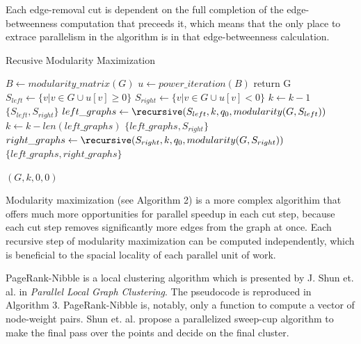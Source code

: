 Each edge-removal cut is dependent on the full completion of the
edge-betweenness computation that preceeds it, which means that the only
place to extrace parallelism in the algorithm is in that
edge-betweenness calculation.  

{\centering
\begin{minipage}{0.9\linewidth}
\begin{algorithm}[H]
	\caption{Recusive Modularity Maximization}



	{
		$B \gets modularity\_matrix(G)$\;
		$u \gets power\_iteration(B)$\;
		{
			return G\;
		}
		$S_{left} \gets \{v | v \in G \cup u[v] \geq 0 \}$\;
		$S_{right} \gets \{v | v \in G \cup u[v] < 0 \}$\;
		$k \gets k - 1$\;
		{
			\Return $\{S_{left}, S_{right}\}$\;
		}
		$left\_graphs \gets \recursive(S_{left}, k, q_0, modularity(G, S_{left}))$\;
		$k \gets k - len(left\_graphs)$\;
		{
			\Return $\{left\_graphs, S_{right}\}$\;
		}
		\Else
		{
			$right\_graphs \gets \recursive(S_{right}, k, q_0, modularity(G, S_{right}))$\;
			\Return $\{left\_graphs, right\_graphs\}$\;
		}
	}

	{
		\Return \recursive$(G, k, 0, 0)$\;
	}
\end{algorithm}
\end{minipage}
}

Modularity maximization (see Algorithm 2) is a more complex algorithim
that offers much more opportunities for parallel speedup in each cut
step, because each cut step removes significantly more edges from the
graph at once. Each recursive step of modularity maximization can be
computed independently, which is beneficial to the spacial locality of
each parallel unit of work.


PageRank-Nibble is a local clustering algorithm which is presented by J.
Shun et.  al. in \emph{Parallel Local Graph Clustering}. The pseudocode
is reproduced in Algorithm 3. PageRank-Nibble is, notably, only a
function to compute a vector of node-weight pairs. Shun et. al. propose
a parallelized sweep-cup algorithm to make the final pass over the
points and decide on the final cluster.

